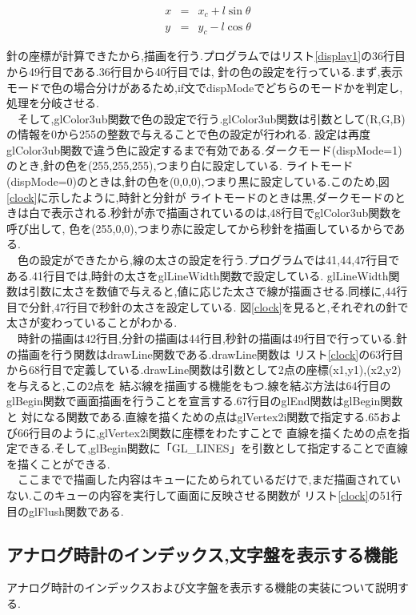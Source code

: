\documentclass[a4j]{jarticle}
\begin{document}
        \begin{eqnarray}
          \label{posix}
    x &=& x_c + l \sin \theta  \\
          \label{posiy}
    y &=& y_c - l \cos \theta
      \end{eqnarray}
        
      針の座標が計算できたから,描画を行う.プログラムではリスト\ref{display1}の36行目から49行目である.36行目から40行目では,
      針の色の設定を行っている.まず,表示モードで色の場合分けがあるため,if文でdispModeでどちらのモードかを判定し,処理を分岐させる.\\
      　そして,glColor3ub関数で色の設定で行う.glColor3ub関数は引数として(R,G,B)の情報を0から255の整数で与えることで色の設定が行われる.
      設定は再度glColor3ub関数で違う色に設定するまで有効である.ダークモード(dispMode=1)のとき,針の色を(255,255,255),つまり白に設定している.
      ライトモード(dispMode=0)のときは,針の色を(0,0,0),つまり黒に設定している.このため,図\ref{clock}に示したように,時針と分針が
      ライトモードのときは黒,ダークモードのときは白で表示される.秒針が赤で描画されているのは,48行目でglColor3ub関数を呼び出して,
      色を(255,0,0),つまり赤に設定してから秒針を描画しているからである.\\
      　色の設定ができたから,線の太さの設定を行う.プログラムでは41,44,47行目である.41行目では,時針の太さをglLineWidth関数で設定している.
      glLineWidth関数は引数に太さを数値で与えると,値に応じた太さで線が描画させる.同様に,44行目で分針,47行目で秒針の太さを設定している.
      図\ref{clock}を見ると,それぞれの針で太さが変わっていることがわかる.\\
      　時針の描画は42行目,分針の描画は44行目,秒針の描画は49行目で行っている.針の描画を行う関数はdrawLine関数である.drawLine関数は
      リスト\ref{clock}の63行目から68行目で定義している.drawLine関数は引数として2点の座標(x1,y1),(x2,y2)を与えると,この2点を
      結ぶ線を描画する機能をもつ.線を結ぶ方法は64行目のglBegin関数で画面描画を行うことを宣言する.67行目のglEnd関数はglBegin関数と
      対になる関数である.直線を描くための点はglVertex2i関数で指定する.65および66行目のように,glVertex2i関数に座標をわたすことで
      直線を描くための点を指定できる.そして,glBegin関数に「GL\_LINES」を引数として指定することで直線を描くことができる.\\
      　ここまでで描画した内容はキューにためられているだけで,まだ描画されていない.このキューの内容を実行して画面に反映させる関数が
      リスト\ref{clock}の51行目のglFlush関数である.

    \subsection{アナログ時計のインデックス,文字盤を表示する機能}
    アナログ時計のインデックスおよび文字盤を表示する機能の実装について説明する.
\end{document}
